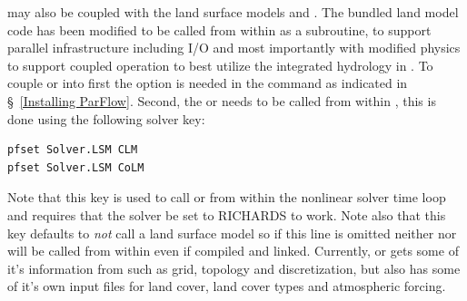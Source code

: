 \parflow{} may also be coupled with the land surface models  \cite{Dai03} and  \cite{Yang2026}.
The bundled land model code has been modified to be called from within \parflow{}
as a subroutine, to support parallel infrastructure including I/O and most importantly with modified
physics to support coupled operation to best utilize the integrated hydrology
 in \parflow{} \cite{MM05, KM08a}.  To couple  or  into \parflow{} first the
  option is needed in the  command as indicated in \S~\ref{Installing ParFlow}.
 Second, the  or  needs to be called from within \parflow{}, this is done using the following
 solver key:
\begin{verbatim}
pfset Solver.LSM CLM
pfset Solver.LSM CoLM
\end{verbatim}
Note that this key is used to call  or  from within the nonlinear solver time loop
and requires that the solver be set to RICHARDS to work.  Note also that this key defaults to
\emph{not} call a land surface model so if this line is omitted neither  nor  will be called from within
\parflow{} even if compiled and linked.  Currently,  or  gets some of it's information from \parflow{}
such as grid, topology and discretization, but also has some of it's own input files for land cover, land cover
types and atmospheric forcing.
